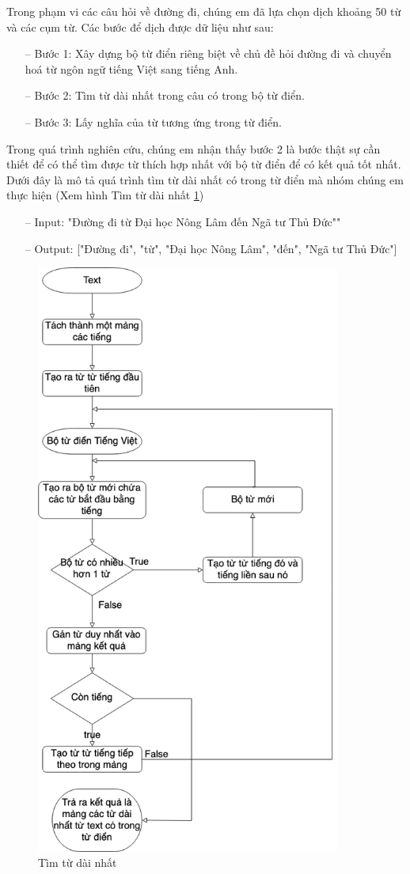 Trong phạm vi các câu hỏi về đường đi, chúng em đã lựa chọn dịch khoảng 50 từ và các cụm từ. Các bước để dịch được dữ liệu như sau:
\begin{itemize}
    \item[--] Bước 1: Xây dựng bộ từ điển riêng biệt về chủ đề hỏi đường đi và chuyển hoá từ ngôn ngữ tiếng Việt sang tiếng Anh.
    \item[--] Bước 2: Tìm từ dài nhất trong câu có trong bộ từ điển.
    \item[--] Bước 3: Lấy nghĩa của từ tương ứng trong từ điển.
\end{itemize}
Trong quá trình nghiên cứu, chúng em nhận thấy bước 2 là bước thật sự cần thiết để có thể tìm được từ thích hợp nhất với bộ từ điển để có kết quả tốt nhất. Dưới đây là mô tả quá trình tìm từ dài nhất có trong từ điển mà nhóm chúng em thực hiện (Xem hình Tìm từ dài nhất \ref{fig:longest-word})
\begin{itemize}
    \item[--] Input: "Đường đi từ Đại học Nông Lâm đến Ngã tư Thủ Đức""
    \item[--] Output: ["Đường đi", "từ", "Đại học Nông Lâm", "đến", "Ngã tư Thủ Đức"]
\end{itemize}
\begin{figure}[htp]
    \centering
    \includegraphics[width=10cm]{images/Diagram-longest-word.png}
    \caption{Tìm từ dài nhất}
    \label{fig:longest-word}
\end{figure}

